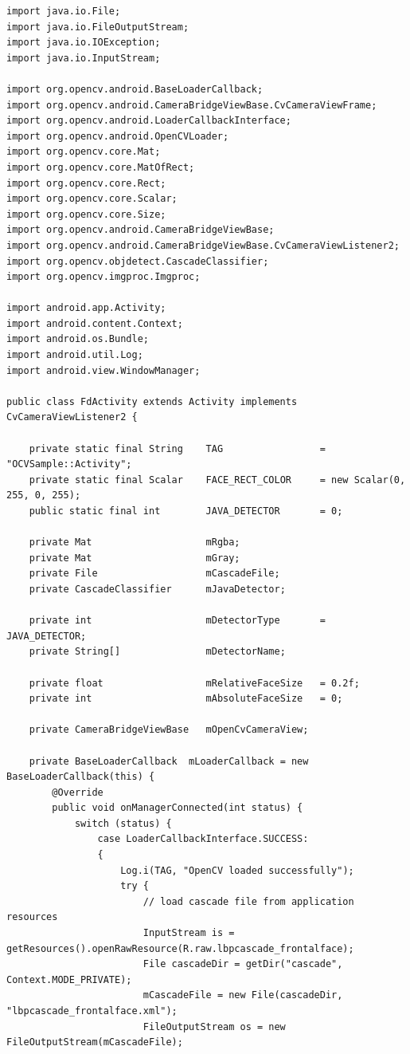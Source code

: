 \documentclass[10pt,a4paper,twoside]{report}
\begin{document}
\begin{appendix}
\begin{tiny}
\begin{flushleft}
\begin{lstlisting}
import java.io.File;
import java.io.FileOutputStream;
import java.io.IOException;
import java.io.InputStream;

import org.opencv.android.BaseLoaderCallback;
import org.opencv.android.CameraBridgeViewBase.CvCameraViewFrame;
import org.opencv.android.LoaderCallbackInterface;
import org.opencv.android.OpenCVLoader;
import org.opencv.core.Mat;
import org.opencv.core.MatOfRect;
import org.opencv.core.Rect;
import org.opencv.core.Scalar;
import org.opencv.core.Size;
import org.opencv.android.CameraBridgeViewBase;
import org.opencv.android.CameraBridgeViewBase.CvCameraViewListener2;
import org.opencv.objdetect.CascadeClassifier;
import org.opencv.imgproc.Imgproc;

import android.app.Activity;
import android.content.Context;
import android.os.Bundle;
import android.util.Log;
import android.view.WindowManager;

public class FdActivity extends Activity implements CvCameraViewListener2 {

    private static final String    TAG                 = "OCVSample::Activity";
    private static final Scalar    FACE_RECT_COLOR     = new Scalar(0, 255, 0, 255);
    public static final int        JAVA_DETECTOR       = 0;

    private Mat                    mRgba;
    private Mat                    mGray;
    private File                   mCascadeFile;
    private CascadeClassifier      mJavaDetector;

    private int                    mDetectorType       = JAVA_DETECTOR;
    private String[]               mDetectorName;

    private float                  mRelativeFaceSize   = 0.2f;
    private int                    mAbsoluteFaceSize   = 0;

    private CameraBridgeViewBase   mOpenCvCameraView;

    private BaseLoaderCallback  mLoaderCallback = new BaseLoaderCallback(this) {
        @Override
        public void onManagerConnected(int status) {
            switch (status) {
                case LoaderCallbackInterface.SUCCESS:
                {
                    Log.i(TAG, "OpenCV loaded successfully");
                    try {
                        // load cascade file from application resources
                        InputStream is = getResources().openRawResource(R.raw.lbpcascade_frontalface);
                        File cascadeDir = getDir("cascade", Context.MODE_PRIVATE);
                        mCascadeFile = new File(cascadeDir, "lbpcascade_frontalface.xml");
                        FileOutputStream os = new FileOutputStream(mCascadeFile);


\end{lstlisting}
\end{flushleft}
\end{tiny}
\end{appendix}
\end{document}
